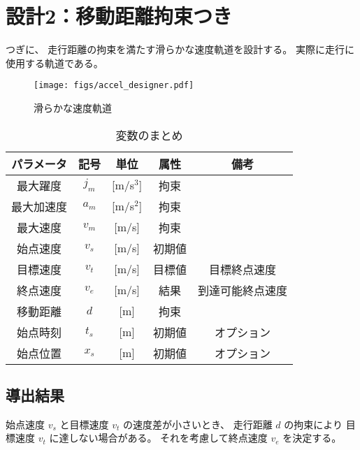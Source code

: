 \documentclass[a5paper]{ltjsarticle}
\begin{document}
\clearpage
\section{設計2：移動距離拘束つき}
つぎに、
走行距離の拘束を満たす滑らかな速度軌道を設計する。
実際に走行に使用する軌道である。
\begin{figure}[htbp]
    \centering
    \texttt{[image: figs/accel\_designer.pdf]}
    \caption{滑らかな速度軌道}
\end{figure}
\begin{table}[htbp]
    \centering
    \caption{変数のまとめ}
    \begin{tabular}{c|c|c|c|c}
        パラメータ & 記号  & 単位        & 属性   & 備考             \\ \hline\hline
        最大躍度   & $j_m$ & [m/s${}^3$] & 拘束   &                  \\
        最大加速度 & $a_m$ & [m/s${}^2$] & 拘束   &                  \\
        最大速度   & $v_m$ & [m/s]       & 拘束   &                  \\
        始点速度   & $v_s$ & [m/s]       & 初期値 &                  \\
        目標速度   & $v_t$ & [m/s]       & 目標値 & 目標終点速度     \\
        終点速度   & $v_e$ & [m/s]       & 結果   & 到達可能終点速度 \\
        移動距離   & $d$   & [m]         & 拘束   &                  \\
        始点時刻   & $t_s$ & [m]         & 初期値 & オプション       \\
        始点位置   & $x_s$ & [m]         & 初期値 & オプション       \\
    \end{tabular}
\end{table}

\subsection{導出結果}
始点速度 $v_s$ と目標速度 $v_t$ の速度差が小さいとき、
走行距離 $d$ の拘束により
目標速度 $v_t$ に達しない場合がある。
それを考慮して終点速度 $v_e$ を決定する。
\end{document}
